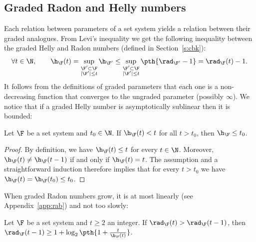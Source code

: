 \subsection{Graded Radon and Helly numbers}\label{s:graded1}
%
%
Each relation between parameters of a set system yields a relation between their graded analogues. From Levi's inequality we get the following inequality between the graded Helly and Radon numbers (defined in Section~\ref{s:cbk}):
%
\begin{equation}\label{eq:gradedhr}
  \forall t \in \N, \qquad \h_\F(t) =  \sup\limits_{\substack{\F'\subset \F \\ |\F'|\leq t}} \h_{\F'} \le \sup\limits_{\substack{\F'\subset \F \\ |\F'|\leq t}} \pth{\rad_{\F'}-1} = \rad_\F(t) - 1. 
\end{equation}
%
It follows from the definitions of graded parameters that each one is a non-decreasing function that converges to the ungraded parameter (possibly $\infty$). We notice that if a graded Helly number is asymptotically sublinear then it is bounded: 
%
\begin{lemma}\label{l:hellygrowth}
  Let $\F$ be a set system and $t_0 \in \N$. If $\h_\F(t) < t$ for all $t>t_0$, then $\h_\F \leq t_0$.
\end{lemma}
\begin{proof}
  By definition, we have $\h_\F(t) \le t$ for every $t \in \N$. Moreover, $\h_\F(t) \neq \h_\F(t-1)$ if and only if $\h_\F(t) = t$. The assumption and a straightforward induction therefore implies that for every $t>t_0$ we have $\h_\F(t) = \h_\F(t_0) \le t_0$.
\end{proof}
%
\noindent
When graded Radon numbers grow, it is at most linearly (see Appendix~\ref{app:rab}) and not too slowly:
%
\begin{lemma}\label{l:radongrowth}
  Let $\F$ be a set system and $t\ge 2$ an integer. If $\rad_\F(t) > \rad_\F(t-1)$, then $\rad_\F(t-1) \ge 1+\log_2\pth{1+\frac{t}{\h_\F(t)}}$.%
\end{lemma}
